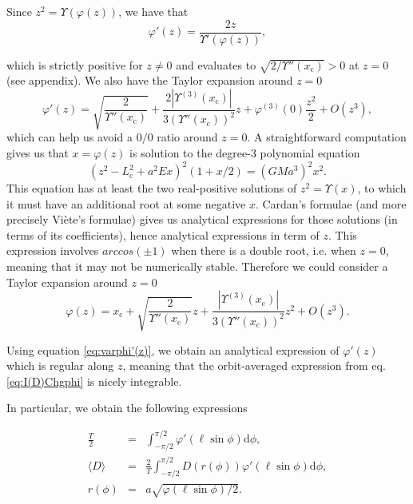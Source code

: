 \documentclass[11pt]{article}
\newcommand{\rc}{\mathrm{c}}
\newcommand{\rd}{{\mathrm{d}}}
\newcommand{\Lc}{L_{\rc}}
\newcommand{\xc}{x_{\rc}}
\begin{document}
Since $z^{2}=\Upsilon(\varphi(z))$, we have that
\begin{equation}
\varphi'(z) = \frac{2 z}{\Upsilon'(\varphi(z))} ,
  \label{eq:varphi'(z)}
\end{equation}

which is strictly positive for $z\neq0$ and evaluates to $\sqrt{2/\Upsilon''(\xc)}>0$ at $z=0$ (see appendix). We also have the Taylor expansion around $z=0$
\begin{equation}
  \varphi'(z) = \sqrt{\frac{2}{\Upsilon''(\xc)}} +\frac{2|\Upsilon^{(3)}(\xc)|}{3(\Upsilon''(\xc))^{2}} z + \varphi^{(3)}(0) \frac{z^{2}}{2}+ O(z^{3}) ,
  \label{eq:TaylorVarphi'Plummer}
  \end{equation}
  which can help us avoid a $0/0$ ratio around $z=0$.
A straightforward computation gives us that $x=\varphi(z)$ is solution to the degree-3 polynomial equation
 $$(z^{2}-\Lc^{2} + a^{2}Ex)^{2}(1+x/2)=(GMa^{3})^{2}x^{2}.$$ 
 This equation has at least the two real-positive solutions of $z^{2}=\Upsilon(x)$, to which it must have an additional root at some negative $x$. Cardan's formulae (and more precisely Viète's formulae) gives us analytical expressions for those solutions (in terms of its coefficients), hence analytical expressions in term of $z$. This expression involves $arccos(\pm 1)$ when there is a double root, i.e. when $z=0$, meaning that it may not be numerically stable. Therefore we could consider a Taylor expansion around $z=0$ 
\begin{equation}
  \varphi(z) = \xc + \sqrt{\frac{2}{\Upsilon''(\xc)}} z +\frac{|\Upsilon^{(3)}(\xc)|}{3(\Upsilon''(\xc))^{2}} z^{2} +  O(z^{3}) .
  \label{eq:TaylorVarphiPlummer}
  \end{equation}


Using equation \eqref{eq:varphi'(z)}, we obtain an analytical expression of $\varphi'(z)$ which is regular along $z$, meaning that the orbit-averaged expression from eq. \eqref{eq:I(D)Chgphi} is nicely integrable.

In particular, we obtain the following expressions

\begin{equation}
  \boxed{
    \begin{array}{ccl}
      \displaystyle{\frac{T}{2}} &=& \displaystyle{\int_{-\pi/2}^{\pi/2}\varphi'(\ell\sin\phi)\rd \phi},\\
      \displaystyle{\langle D\rangle} &=& \displaystyle{\frac{2}{T}\int_{-\pi/2}^{\pi/2}D(r(\phi))\varphi'(\ell\sin\phi)\rd \phi}, \\
      r(\phi) &=& a\sqrt{\varphi(\ell\sin\phi)/2}.
    \end{array}
  }
  \label{eq:periodAndOAD}
 \end{equation}
\end{document}
